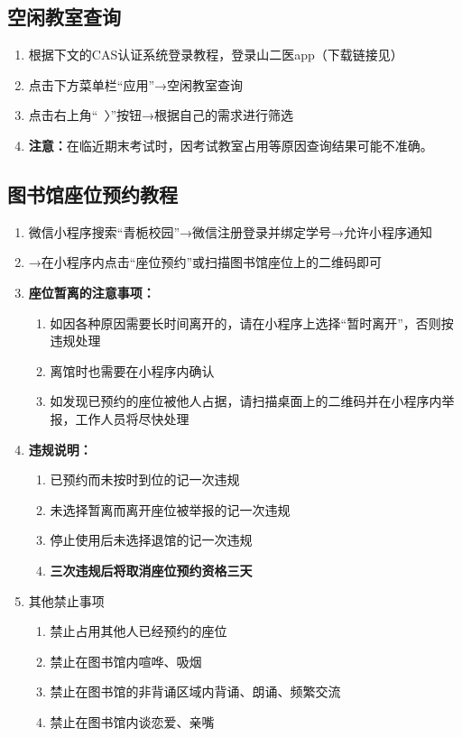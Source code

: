 \subsection[空闲教室查询]{空闲教室查询}
\label{spare_classroom}
\begin{enumerate}
    \item 根据下文的CAS认证系统登录教程，登录山二医app（下载链接见）
    \item 点击下方菜单栏“应用”→空闲教室查询
    \item 点击右上角“\ 〉”按钮→根据自己的需求进行筛选
    \item \textbf{注意：}在临近期末考试时，因考试教室占用等原因查询结果可能不准确。
\end{enumerate}

\subsection[图书馆座位预约教程]{图书馆座位预约教程}
\label{library_book}
\begin{enumerate}
    \item 微信小程序搜索“青栀校园”→微信注册登录并绑定学号→允许小程序通知
    \item →在小程序内点击“座位预约”或扫描图书馆座位上的二维码即可
    \item \textbf{座位暂离的注意事项：}
          \begin{enumerate}
              \item 如因各种原因需要长时间离开的，请在小程序上选择“暂时离开”，否则按违规处理
              \item 离馆时也需要在小程序内确认
              \item 如发现已预约的座位被他人占据，请扫描桌面上的二维码并在小程序内举报，工作人员将尽快处理
          \end{enumerate}
    \item \textbf{违规说明：}
          \begin{enumerate}
              \item 已预约而未按时到位的记一次违规
              \item 未选择暂离而离开座位被举报的记一次违规
              \item 停止使用后未选择退馆的记一次违规
              \item \textbf{三次违规后将取消座位预约资格三天}
          \end{enumerate}
    \item 其他禁止事项
          \begin{enumerate}
              \item 禁止占用其他人已经预约的座位
              \item 禁止在图书馆内喧哗、吸烟
              \item 禁止在图书馆的非背诵区域内背诵、朗诵、频繁交流
              \item 禁止在图书馆内谈恋爱、亲嘴
          \end{enumerate}
\end{enumerate}

